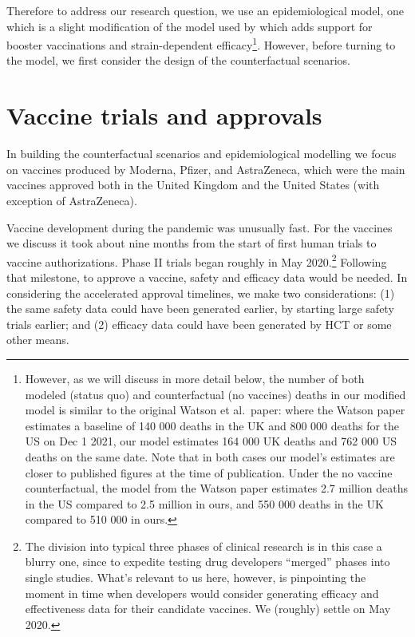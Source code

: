 \documentclass{article}
\begin{document}
Therefore to address our research question, we use an epidemiological model, one which is a slight modification of the model used by \citet{watsonGlobalImpactFirst2022} which adds support for booster vaccinations and strain-dependent efficacy\footnote{However, as we will discuss in more detail below, the number of both modeled (status quo) and counterfactual (no vaccines) deaths in our modified model is similar to the original Watson et al.~paper: where the Watson paper estimates a baseline of 140 000 deaths in the UK and 800 000 deaths for the US on Dec 1 2021, our model estimates 164 000 UK deaths and 762 000 US deaths on the same date. Note that in both cases our model's estimates are closer to published figures at the time of publication. Under the no vaccine counterfactual, the model from the Watson paper estimates 2.7 million deaths in the US compared to 2.5 million in ours, and 550 000 deaths in the UK compared to 510 000 in ours.}. However, before turning to the model, we first consider the design of the counterfactual scenarios.

\section{Vaccine trials and approvals}\label{vaccine-trials-and-approvals}

In building the counterfactual scenarios and epidemiological modelling we focus on vaccines produced by Moderna, Pfizer, and AstraZeneca, which were the main vaccines approved both in the United Kingdom and the United States (with exception of AstraZeneca).

Vaccine development during the pandemic was unusually fast. For the vaccines we discuss it took about nine months from the start of first human trials to vaccine authorizations. Phase II trials began roughly in May 2020.\footnote{The division into typical three phases of clinical research is in this case a blurry one, since to expedite testing drug developers ``merged'' phases into single studies. What's relevant to us here, however, is pinpointing the moment in time when developers would consider generating efficacy and effectiveness data for their candidate vaccines. We (roughly) settle on May 2020.} Following that milestone, to approve a vaccine, safety and efficacy data would be needed. In considering the accelerated approval timelines, we make two considerations: (1) the same safety data could have been generated earlier, by starting large safety trials earlier; and (2) efficacy data could have been generated by HCT or some other means.
\end{document}
